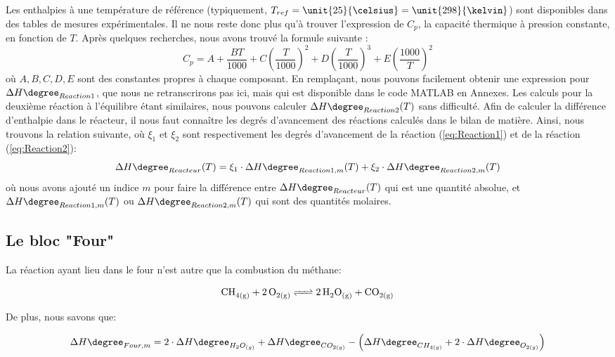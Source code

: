 Les enthalpies à une température de référence (typiquement, $T_{ref}=\unit{25}{\celsius}=\unit{298}{\kelvin}$) sont
disponibles dans des tables de mesures expérimentales. Il ne nous reste donc plus qu'à trouver
l'expression de $C_p$, la capacité thermique à pression constante, en fonction de $T$.
Après quelques recherches, nous avons trouvé la formule suivante \cite{NIST}: \begin{equation}\label{eqref:capacite}
C_p=A+\dfrac{BT}{1000}+C\left(\dfrac{T}{1000}\right)^2+D\left(\dfrac{T}{1000}\right)^3+E\left(\dfrac{1000}{T}\right)^2
\end{equation} où $A,B,C,D,E$ sont des constantes propres à chaque composant\cite{NIST}.
En remplaçant, nous pouvons facilement obtenir une expression pour $\Delta H\degree_{Reaction1}$, que nous ne retranscrirons pas
ici, mais qui est disponible dans le code \textsc{MATLAB} en Annexes. 
Les calculs pour la deuxième réaction à l'équilibre étant similaires, nous pouvons
calculer $\Delta H\degree_{Reaction2}(T)$ sans difficulté. Afin de calculer la différence d'enthalpie dans le réacteur,
il nous faut connaître les degrés d'avancement des réactions calculés dans le bilan de matière. Ainsi, nous
trouvons la relation suivante, où $\xi_1$ et $\xi_2$ sont respectivement les degrés d'avancement de la
réaction (\ref{eq:Reaction1}) et de la réaction (\ref{eq:Reaction2}):
\begin{equation}\label{eq:deltaHreacteur}{\Delta H\degree_{Reacteur}(T)=\xi_1\cdot\Delta H\degree_{Reaction1,m}(T)+\xi_2\cdot\Delta H\degree_{Reaction2,m}(T)}\end{equation}
où nous avons ajouté un indice $m$ pour faire la différence entre $\Delta H\degree_{Reacteur}(T)$ qui est une quantité absolue, 
et $\Delta H\degree_{Reaction1,m}(T)$ ou $\Delta H\degree_{Reaction2,m}(T)$ qui sont des quantités molaires.

\newpage

\subsection{Le bloc "Four"}
La réaction ayant lieu dans le four n'est autre que la combustion du méthane:

\begin{equation}\label{combust.methane}\ce{CH_{4(g)} + 2O_{2(g)} <=> 2H_2O_{(g)} + CO_{2(g)}}\end{equation}

De plus, nous savons que:

$$\Delta H\degree_{Four,m} = 2\cdot \Delta H\degree_{H_{2}O_{(g)}} + \Delta H\degree_{CO_{2(g)}}
- \left(\Delta H\degree_{CH_{4(g)}} + 2\cdot \Delta H\degree_{O_{2(g)}}\right)$$

